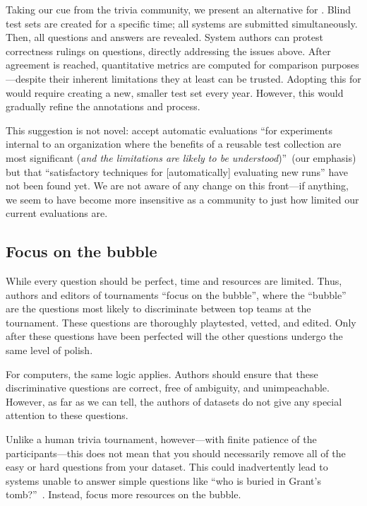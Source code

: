 Taking our cue from the trivia community, we present an alternative
for .
Blind test sets are created for a specific time; all systems are submitted simultaneously.
Then, all questions and answers are revealed.
System authors can protest correctness rulings on questions, directly
addressing the issues above. 
After agreement is reached,
quantitative metrics are computed for comparison purposes---despite their inherent limitations they at least can be
trusted.
Adopting this for  would require creating a new, smaller test
set every year.
However, this would gradually refine the annotations and process.

This suggestion is not novel: \citet{voorhees-00} accept automatic
evaluations ``for experiments internal to an organization where the
benefits of a reusable test collection are most significant (\emph{and
  the limitations are likely to be understood})''~(our emphasis) but
that ``satisfactory techniques for [automatically] evaluating new
runs'' have not been found yet.  We are not aware of any change on
this front---if anything, we seem to have become more insensitive as a
community to just how limited our current evaluations are.

\subsection{Focus on the bubble}

While every question should be perfect, time and resources are limited.  
Thus, authors and editors of tournaments ``focus on the bubble'', where the ``bubble'' are the questions most likely to discriminate between top teams at the tournament.
These questions are thoroughly playtested, vetted, and edited.
Only after these questions have been perfected will the other questions undergo the same level of polish.

For computers, the same logic applies.  
Authors should ensure that these discriminative questions are correct, free of ambiguity, and unimpeachable.
However, as far as we can tell, the authors of \qa{} datasets do not give any special attention to these questions.

Unlike a human trivia tournament, however---with finite patience of the participants---this does not mean that you should necessarily remove all of the easy or hard questions from your dataset.
This could inadvertently lead to systems unable to answer simple questions like ``who is buried in Grant's tomb?''~\cite[Chapter 7]{dwan-00}.
Instead, focus more resources on the bubble.

